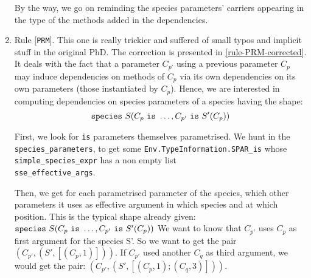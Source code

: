 \begin{enumerate}
  By the way, we go on reminding the species parameters' carriers
  appearing in the type of the methods added in the dependencies.

\item Rule [{\tt PRM}].
  This one is really trickier and suffered of
  small typos and implicit stuff in the original PhD. The correction
  is presented in \ref{rule-PRM-corrected}.
  It deals with the fact that a parameter $C_{p'}$ using a previous
  parameter $C_p$ may induce dependencies on methods of $C_p$ via its
  own dependencies on its own parameters (those instantiated by
  $C_p$). Hence, we are interested in computing dependencies on
  species parameters of a species having the shape:
  $${\tt species}\ S (C_p\ {\tt is}\ \ldots, C_{p'}\ {\tt is}\ S'(C_p))$$

  First, we look for {\tt is} parameters themselves parametrised. We
  hunt in the {\tt species\_parameters}, to get some
  {\tt Env.TypeInformation.SPAR\_is} whose
  {\tt simple\_species\_expr} has a non empty list \\
  {\tt sse\_effective\_args}.

  Then, we get for each parametrised parameter of the species, which
  other parameters it uses as effective argument in which species and
  at which position.
  This is the typical shape already given: \\
  ${\tt species}\ S (C_p\ {\tt is}\ \ldots, C_{p'}\ {\tt is}\ S'(C_p))$
  We want to know that $C_{p'}$ uses $C_p$ as first argument for the
  species S'.
  So we want to get the pair $(C_{p'}, (S', [(C_p, 1)]))$. If $C_{p'}$
  used another $C_q$ as third argument, we would get the pair:
  $(C_{p'}, (S', [(C_p, 1); (C_q, 3)]))$.


\end{enumerate}
